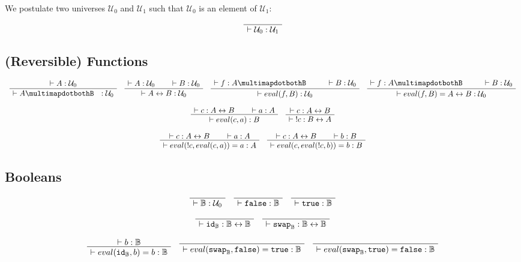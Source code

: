 \documentclass[format=acmlarge,review,natbib]{acmart}
\newcommand{\invc}[1]{!#1}
\newcommand{\evalone}[2]{eval(#1,#2)}
\newcommand{\idc}{\mathtt{id}}
\newcommand{\swapc}{\mathtt{swap}}
\newcommand{\iso}{\leftrightarrow}
\newcommand{\piso}{\multimapdotbothB~~}
\newcommand{\fc}{\mathtt{false}}
\newcommand{\tc}{\mathtt{true}}
\newcommand{\boolt}{\mathbb{B}}
\newcommand{\uzero}{\mathcal{U}_0}
\newcommand{\uone}{\mathcal{U}_1}
\newcommand{\proves}{\vdash}
\newcommand{\jdg}[3]{#1 \proves #2 : #3}
\begin{document}
We postulate two universes $\uzero$ and $\uone$ such that $\uzero$ is an element
of $\uone$:

\[
  \AxiomC{}
  \UnaryInfC{$\jdg{}{\uzero}{\uone}$}
  \DisplayProof
\]

\subsection{(Reversible) Functions}

\[
  \begin{array}{c}
    \AxiomC{$\jdg{}{A}{\uzero}$}
    \UnaryInfC{$\jdg{}{A\piso}{\uzero}$}
    \DisplayProof
    \quad
    \AxiomC{$\jdg{}{A}{\uzero}$}
    \AxiomC{$\jdg{}{B}{\uzero}$}
    \BinaryInfC{$\jdg{}{A\iso B}{\uzero}$}
    \DisplayProof
    \quad
    \AxiomC{$\jdg{}{f}{A \piso}$}
    \AxiomC{$\jdg{}{B}{\uzero}$}
    \BinaryInfC{$\jdg{}{\evalone{f}{B}}{\uzero}$}
    \DisplayProof
    \quad
    \AxiomC{$\jdg{}{f}{A \piso}$}
    \AxiomC{$\jdg{}{B}{\uzero}$}
    \BinaryInfC{$\jdg{}{\evalone{f}{B} = A \iso B}{\uzero}$}
    \DisplayProof
    \\
    \\
    \AxiomC{$\jdg{}{c}{A \iso B}$}
    \AxiomC{$\jdg{}{a}{A}$}
    \BinaryInfC{$\jdg{}{\evalone{c}{a}}{B}$}
    \DisplayProof
    \quad
    \AxiomC{$\jdg{}{c}{A \iso B}$}
    \UnaryInfC{$\jdg{}{\;\invc{c}}{B \iso A}$}
    \DisplayProof
    \\
    \\
    \AxiomC{$\jdg{}{c}{A \iso B}$}
    \AxiomC{$\jdg{}{a}{A}$}
    \BinaryInfC{$\jdg{}{\evalone{\invc{c}}{\evalone{c}{a}} = a}{A}$}
    \DisplayProof
    \quad
    \AxiomC{$\jdg{}{c}{A \iso B}$}
    \AxiomC{$\jdg{}{b}{B}$}
    \BinaryInfC{$\jdg{}{\evalone{c}{\evalone{\invc{c}}{b}} = b}{B}$}
    \DisplayProof
  \end{array}
\]

\subsection{Booleans}

\[
  \begin{array}{c}
    \AxiomC{}
    \UnaryInfC{$\jdg{}{\boolt}{\uzero}$}
    \DisplayProof
    \quad
    \AxiomC{}
    \UnaryInfC{$\jdg{}{\fc}{\boolt}$}
    \DisplayProof
    \quad
    \AxiomC{}
    \UnaryInfC{$\jdg{}{\tc}{\boolt}$}
    \DisplayProof
    \\
    \\
    \AxiomC{}
    \UnaryInfC{$\jdg{}{\idc_{\boolt}}{\boolt\iso\boolt}$}
    \DisplayProof
    \quad
    \AxiomC{}
    \UnaryInfC{$\jdg{}{\swapc_{\boolt}}{\boolt\iso\boolt}$}
    \DisplayProof
    \\
    \\
    \AxiomC{$\jdg{}{b}{\boolt}$}
    \UnaryInfC{$\jdg{}{\evalone{\idc_{\boolt}}{b} = b}{\boolt}$}
    \DisplayProof
    \quad
    \AxiomC{}
    \UnaryInfC{$\jdg{}{\evalone{\swapc_{\boolt}}{\fc} = \tc}{\boolt}$}
    \DisplayProof
    \quad
    \AxiomC{}
    \UnaryInfC{$\jdg{}{\evalone{\swapc_{\boolt}}{\tc} = \fc}{\boolt}$}
    \DisplayProof
  \end{array}
\]
\end{document}
